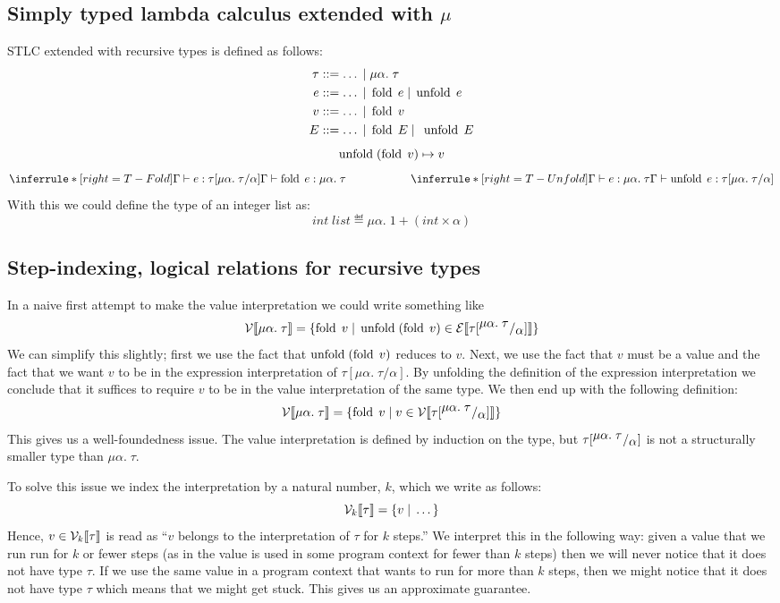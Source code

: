 \subsection*{Simply typed lambda calculus extended with $\mu$}
STLC extended with recursive types is defined as follows:
\begin{align*}
  \tau &::= \dots \; | \; \mu \alpha. \; \tau \\
  e    &::= \dots \; | \; \operatorname{fold} \; e \; | \; \operatorname{unfold} \; e \\
  v    &::= \dots \; | \; \operatorname{fold} \; v\\
  E    &::= \dots \; | \; \operatorname{fold} \; E \; | \; \; \operatorname{unfold} \; E
\end{align*}
\[
\operatorname{unfold} \; (\operatorname{fold} \; v) \mapsto v
\]
\[
\TFold \hspace{2cm} \TUnfold
\]
With this we could define the type of an integer list as:
\[
int\; list \eqdef \mu\alpha.\; 1 + (int \times \alpha)
\]
\begin{comment}
\[
  \Omega = (\tlabs{x}{\mu\alpha.\; \tarrow{\alpha}{\tau}}{(\unfold \; x) \; x}) 
\]
\end{comment}

\subsection*{Step-indexing, logical relations for recursive types}
In a naive first attempt to make the value interpretation we could write something like
\[
  \mathcal{V}\llbracket \mu\alpha. \; \tau \rrbracket = \{\operatorname{fold} \; v \; | \; \operatorname{unfold} \; (\operatorname{fold} \; v) \in \mathcal{E}\llbracket \tau[^{\textstyle \mu\alpha.\;\tau}/_{\textstyle \alpha}] \rrbracket \}
\]
We can simplify this slightly; first we use the fact that $\operatorname{unfold} \; (\operatorname{fold} \; v)$ reduces to $v$. Next, we use the fact that $v$ must be a value and the fact that we want $v$ to be in the expression interpretation of $\tau[\mu \alpha. \; \tau / \alpha]$. By unfolding the definition of the expression interpretation we conclude that it suffices to require $v$ to be in the value interpretation of the same type. We then end up with the following definition:
\[
  \mathcal{V}\llbracket \mu\alpha. \; \tau \rrbracket = \{\operatorname{fold} \; v \; | \; v \in \mathcal{V}\llbracket \tau[^{\textstyle \mu\alpha.\;\tau}/_{\textstyle \alpha}] \rrbracket \}
\]
This gives us a well-foundedness issue. The value interpretation is defined by induction on the type, but $\tau[^{\textstyle \mu\alpha.\;\tau}/_{\textstyle \alpha}]$ is not a structurally smaller type than $\mu\alpha. \; \tau$. 

To solve this issue we index the interpretation by a natural number, $k$, which we write as follows:
\[
  \mathcal{V}_{k}\llbracket \tau \rrbracket = \{v \; | \; \dots \}
\]
Hence, $v \in \mathcal{V}_{k}\llbracket \tau \rrbracket$ is read as ``$v$ belongs to the interpretation of $\tau$ for $k$ steps.'' We interpret this in the following way: given a value that we run run for $k$ or fewer steps (as in the value is used in some program context for fewer than $k$ steps) then we will never notice that it does not have type $\tau$. If we use the same value in a program context that wants to run for more than $k$ steps, then we might notice that it does not have type $\tau$ which means that we might get stuck. This gives us an approximate guarantee.

